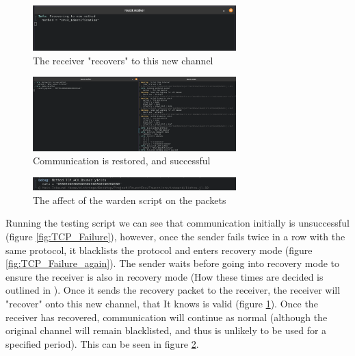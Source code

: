 \begin{figure}[H]
    \centering
    \includegraphics[width=0.7\textwidth]{fig/Recv_rec_resp.png}
    \caption{The receiver "recovers" to this new channel}
    \label{fig:recovery}
\end{figure}

\begin{figure}[H]
    \centering
    \includegraphics[width=0.7\textwidth]{fig/Comm_works.png}
    \caption{Communication is restored, and successful}
    \label{fig:successful_comms}
\end{figure}

\begin{figure}[H]
    \centering
    \includegraphics[width=0.7\textwidth]{fig/DEBUG_SHOW_WARDEN.png}
    \caption{The affect of the warden script on the packets}
    \label{fig:warden_affect}
\end{figure}

Running the testing script we can see that communication initially is unsuccessful (figure \ref{fig:TCP_Failure}), however, once the sender fails twice in a row with the same protocol, it blacklists the protocol and enters recovery mode (figure \ref{fig:TCP_Failure_again}). The sender waits before going into recovery mode to ensure the receiver is also in recovery mode (How these times are decided is outlined in ). Once it sends the recovery packet to the receiver, the receiver will "recover" onto this new channel, that It knows is valid (figure \ref{fig:recovery}). Once the receiver has recovered, communication will continue as normal (although the original channel will remain blacklisted, and thus is unlikely to be used for a specified period). This can be seen in figure \ref{fig:successful_comms}.

